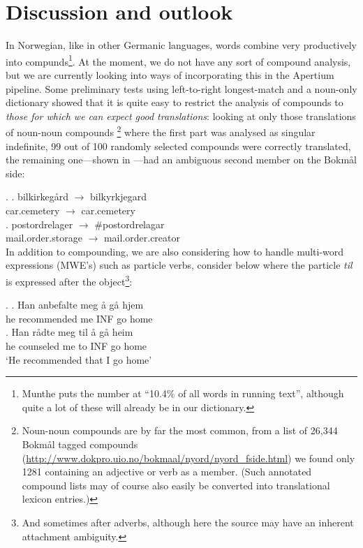 \documentclass[11pt]{article}
\begin{document}
\section{Discussion and outlook}
In Norwegian, like in other Germanic languages, words combine very
productively into compunds\footnote{Munthe \citep[1972,
  in][p.~1]{johannessen1996aan} puts the number at ``10.4\% of all
  words in running text'', although quite a lot of these will already
  be in our dictionary.}. At the moment, we do not have any sort of
compound analysis, but we are currently looking into ways of
incorporating this in the Apertium pipeline. Some preliminary tests
using left-to-right longest-match and a noun-only dictionary showed
that it is quite easy to restrict the analysis of compounds to
\emph{those for which we can expect good translations}: looking at
only those translations of noun-noun compounds \footnote{Noun-noun
  compounds are by far the most common, from a list of 26,344 Bokmål
  tagged compounds
  (\href{http://www.dokpro.uio.no/bokmaal/nyord/nyord_fside.html}{http://www.dokpro.uio.no/bokmaal/nyord/nyord\_fside.html})
  we found only 1281 containing an adjective or verb as a
  member. (Such annotated compound lists may of course also easily be
  converted into translational lexicon entries.)} where the first part
was analysed as singular indefinite, 99 out of 100 randomly selected
compounds were correctly translated, the remaining one—shown in
\Next[b]—had an ambiguous second member on the Bokmål side:

\ex. \ag. bilkirkegård $\rightarrow$ bilkyrkjegard\\
car.cemetery $\rightarrow$ car.cemetery\\
\bg. postordrelager $\rightarrow$ \#postordrelagar\\
mail.order.storage $\rightarrow$ mail.order.creator\\

In addition to compounding, we are also considering how to handle
multi-word expressions (MWE's) such as particle verbs, consider \Next below
where the particle \emph{til} is expressed after the
object\footnote{And sometimes after adverbs, although here the source
  may have an inherent attachment ambiguity.}:

\ex. \ag. Han anbefalte meg å gå hjem\\
he recommended me INF go home\\
\bg. Han rådte meg til å gå heim\\
he counseled me to INF go home\\
`He recommended that I go home'
\end{document}
